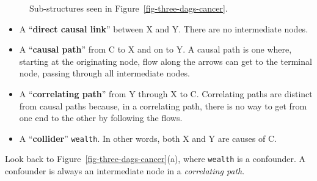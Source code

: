 \documentclass[
  letterpaper,
  DIV=11,
  numbers=noendperiod,
  oneside]{scrreprt}
\begin{document}
\begin{figure}
\begin{minipage}[t]{0.25\linewidth}
{{}

}

\end{minipage}%
%
\begin{minipage}[t]{0.25\linewidth}

{\centering 


}

\end{minipage}%

\caption{\label{fig-dags-paths}Sub-structures seen in
Figure~\ref{fig-three-dags-cancer}.}

\end{figure}

\begin{itemize}
\item
  A ``\textbf{direct causal link}'' between X and Y. There are no
  intermediate nodes.
\item
  A ``\textbf{causal path}'' from C to X and on to Y. A causal path is
  one where, starting at the originating node, flow along the arrows can
  get to the terminal node, passing through all intermediate nodes.
\item
  A ``\textbf{correlating path}'' from Y through X to C. Correlating
  paths are distinct from causal paths because, in a correlating path,
  there is no way to get from one end to the other by following the
  flows.
\item
  A ``\textbf{collider}'' \texttt{wealth}. In other words, both X and Y
  are causes of C.
\end{itemize}

Look back to Figure~\ref{fig-three-dags-cancer}(a), where
\texttt{wealth} is a confounder. A confounder is always an intermediate
node in a \emph{correlating path}.
\end{document}
